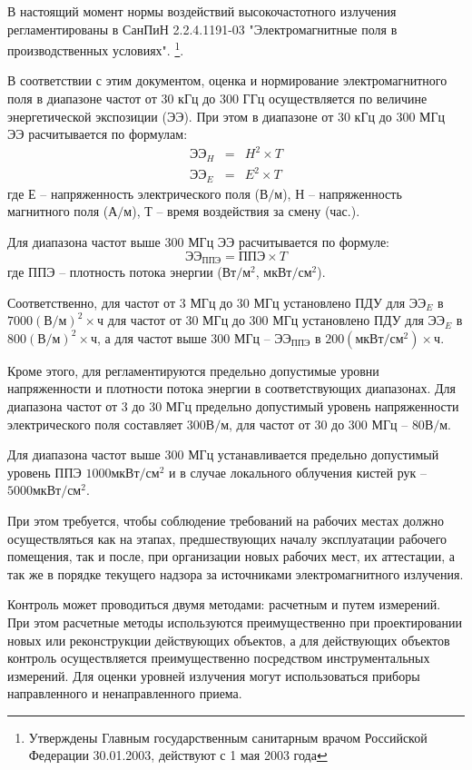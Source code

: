 В настоящий момент нормы воздействий высокочастотного излучения регламентированы
в СанПиН 2.2.4.1191-03 "Электромагнитные поля в производственных условиях".
\footnote{Утверждены Главным государственным санитарным врачом Российской Федерации 30.01.2003, действуют с 1 мая 2003 года}\cite{2003sanpin}.

В соответствии с этим документом, оценка и нормирование электромагнитного поля в диапазоне 
частот от 30 кГц до 300 ГГц осуществляется по величине энергетической экспозиции (ЭЭ).
При этом в диапазоне от 30 кГц до 300 МГц ЭЭ расчитывается по формулам:
\begin{eqnarray}
    ЭЭ_{H} &=& H^2 \times T  \\
    ЭЭ_{E} &=& E^2 \times T  
\end{eqnarray}
где $Е$ -- напряженность электрического поля ($В/м$), $Н$ -- напряженность магнитного поля ($А/м$), $Т$ -- время воздействия за смену (час.).

Для диапазона частот выше 300 МГц ЭЭ расчитывается по формуле:
\begin{equation}
  ЭЭ_{ППЭ} = ППЭ \times T
\end{equation}
где $ППЭ$ -- плотность потока энергии ($Вт/м^2$, $мкВт/см^2$).

Соответственно, 
для частот от 3 МГц до 30 МГц установлено ПДУ для $ЭЭ_{E}$ в $7000 (В/м)^2\times ч$
для частот от 30 МГц до 300 МГц установлено ПДУ для $ЭЭ_{E}$ в $800 (В/м)^2\times ч$,
а для частот выше 300 МГц -- $ЭЭ_{ППЭ}$ в $200 (мкВт/см^2) \times ч$.

Кроме этого, для регламентируются предельно допустимые уровни напряженности и плотности потока энергии
в соответствующих диапазонах.
Для диапазона частот от 3 до 30 МГц предельно допустимый уровень напряженности 
электрического поля составляет $300 В/м$, для частот от 30 до 300 МГц -- $80 В/м$.

Для диапазона частот выше 300 МГц устанавливается предельно допустимый уровень ППЭ $1000 мкВт/см^2$ и в случае локального облучения кистей рук -- $5000 мкВт/см^2$.

При этом требуется, чтобы соблюдение требований на рабочих местах должно осуществляться 
как на этапах, предшествующих началу эксплуатации рабочего помещения, так и после,
при организации новых рабочих мест, их аттестации, а так же в порядке текущего надзора
за источниками электромагнитного излучения.

Контроль может проводиться двумя методами: расчетным и путем измерений.
При этом расчетные методы используются преимущественно при проектировании новых или реконструкции действующих объектов, а для действующих объектов контроль осуществляется преимущественно посредством инструментальных измерений. Для оценки уровней 
излучения могут использоваться приборы направленного и ненаправленного приема.

